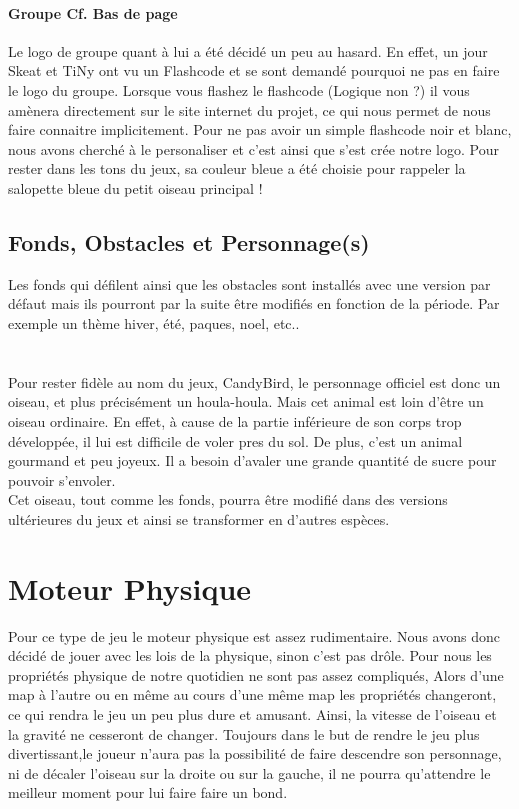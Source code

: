 \documentclass [11pt]{report}
\begin{document}
			\paragraph{Groupe Cf. Bas de page}
				Le logo de groupe quant à lui a été décidé un peu au hasard. En effet, un jour Skeat et TiNy ont vu un Flashcode et se sont demandé pourquoi ne pas en faire le logo du groupe. Lorsque vous flashez le flashcode (Logique non ?) il vous amènera directement sur le site internet du projet, ce qui nous permet de nous 				faire connaitre implicitement. Pour ne pas avoir un simple flashcode noir et blanc, nous avons cherché à le personaliser et c'est ainsi que s'est crée notre logo. Pour rester dans les tons du jeux, sa couleur bleue a été choisie pour rappeler la salopette bleue du petit oiseau principal !\\\vspace{5mm}

		\subsection {Fonds, Obstacles et Personnage(s)}
	 		Les fonds qui défilent ainsi que les obstacles sont installés avec une version par défaut mais ils pourront par la suite être modifiés en fonction de la période. Par exemple un thème hiver, été, paques, noel, etc..\\\\\\
 			\indent Pour rester fidèle au nom du jeux, CandyBird, le personnage officiel est donc un oiseau, et plus précisément un houla-houla.
 			\indent Mais cet animal est loin d'être un oiseau ordinaire. En effet, à cause de la partie inférieure de son corps trop développée, il lui est difficile de voler pres du sol. De plus, c'est un animal gourmand et peu joyeux. Il a besoin d'avaler une grande quantité de sucre pour pouvoir s'envoler.\\
			\indent Cet oiseau, tout comme les fonds, pourra être modifié dans des versions ultérieures du jeux et ainsi se transformer en d'autres espèces.\\\vspace{5mm}



	\section {Moteur Physique}
			Pour ce type de jeu le moteur physique est assez rudimentaire. Nous avons donc décidé de jouer avec les lois de la physique, sinon c'est pas drôle. Pour nous les propriétés physique de notre quotidien ne sont pas assez compliqués, Alors d'une map à l'autre ou en même au cours d'une même map les propriétés 				changeront, ce qui rendra le jeu un peu plus dure et amusant. Ainsi, la vitesse de l'oiseau et la gravité ne cesseront de changer. Toujours dans le but de rendre le jeu plus divertissant,le joueur n'aura pas la possibilité de faire descendre son personnage, ni de décaler l'oiseau sur la droite ou sur la gauche, il ne pourra qu'attendre le meilleur 	moment pour lui faire faire un bond.\\\vspace{5mm}
\end{document}

